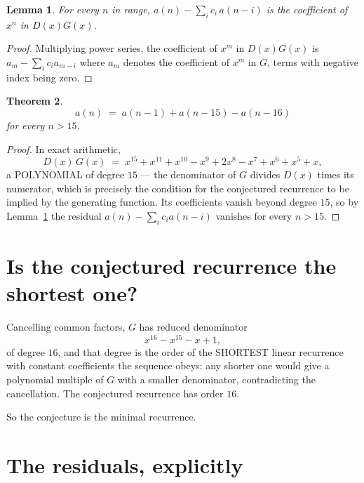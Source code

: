 \documentclass[11pt,a4paper]{article}
\theoremstyle{plain}
\newtheorem{theorem}{Theorem}
\newtheorem{lemma}[theorem]{Lemma}
\theoremstyle{definition}
\begin{document}
\begin{lemma}\label{lem:key}
For every $n$ in range, $a(n)-\sum_i c_i\,a(n-i)$ is the coefficient of $x^{n}$ in
$D(x)G(x)$.
\end{lemma}

\begin{proof}
Multiplying power series, the coefficient of $x^{m}$ in $D(x)G(x)$ is
$a_m-\sum_i c_i a_{m-i}$ where $a_m$ denotes the coefficient of $x^{m}$ in $G$, terms with
negative index being zero.
\end{proof}

\begin{theorem}
\[
a(n)\;=\;a(n-1) + a(n-15) - a(n-16)
\]
for every $n>15$.
\end{theorem}

\begin{proof}
In exact arithmetic,
\[
D(x)\,G(x)\;=\;x^{15} + x^{11} + x^{10} - x^{9} + 2 x^{8} - x^{7} + x^{6} + x^{5} + x,
\]
a POLYNOMIAL of degree $15$ --- the denominator of $G$ divides $D(x)$ times its numerator,
which is precisely the condition for the conjectured recurrence to be implied by the
generating function. Its coefficients vanish beyond degree $15$, so by
Lemma~\ref{lem:key} the residual $a(n)-\sum_ic_ia(n-i)$ vanishes for every
$n>15$.
\end{proof}

\section{Is the conjectured recurrence the shortest one?}

Cancelling common factors, $G$ has reduced denominator
\[
x^{16} - x^{15} - x + 1,
\]
of degree $16$, and that degree is the order of the SHORTEST linear recurrence with
constant coefficients the sequence obeys: any shorter one would give a polynomial multiple of
$G$ with a smaller denominator, contradicting the cancellation. The conjectured recurrence has
order $16$.

So the conjecture is the minimal recurrence.

\section{The residuals, explicitly}
\end{document}
